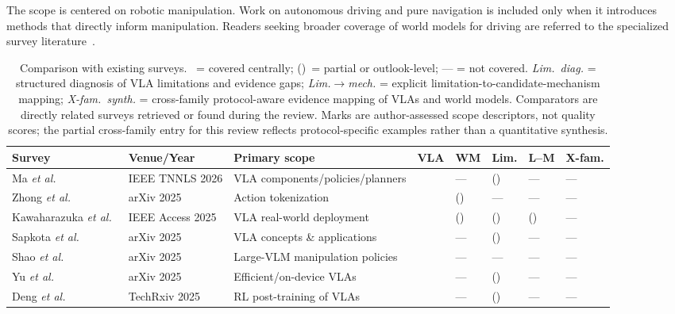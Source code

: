 \documentclass{ieeeaccess}
\newcommand{\cmark}{\ding{51}}
\begin{document}
The scope is centered on robotic manipulation. Work on autonomous driving and pure navigation is included only when it introduces methods that directly inform manipulation. Readers seeking broader coverage of world models for driving are referred to the specialized survey literature~\cite{jiang2025driving}.
\begin{table}[!t]
\caption{Comparison with existing surveys. \cmark~= covered centrally;
(\cmark)~= partial or outlook-level; --- = not covered. \emph{Lim.\ diag.} =
structured diagnosis of VLA limitations and evidence gaps; \emph{Lim.$\to$mech.} =
explicit limitation-to-candidate-mechanism mapping; \emph{X-fam.\ synth.} = cross-family
protocol-aware evidence mapping of VLAs and world models. Comparators are
directly related surveys retrieved or found during the review. \textcolor[RGB]{104,48,148}{Marks are author-assessed scope descriptors, not quality scores; the partial cross-family entry for this review reflects protocol-specific examples rather than a quantitative synthesis.}}
\label{tab:surveys}
\centering
\scriptsize
\setlength{\tabcolsep}{2.5pt}
\begin{tabular}{p{2.7cm}p{2.1cm}p{4.3cm}p{0.8cm}p{0.8cm}p{0.8cm}p{0.8cm}p{0.8cm}}
\toprule
Survey & Venue/Year & Primary scope & VLA & WM & Lim. & L--M & X-fam. \\
\midrule
Ma \emph{et al.}~\cite{ma2024survey} & IEEE TNNLS 2026 & VLA components/policies/planners & \cmark & --- & (\cmark) & --- & --- \\
Zhong \emph{et al.}~\cite{zhong2025token} & arXiv 2025 & Action tokenization & \cmark & (\cmark) & --- & --- & --- \\
Kawaharazuka \emph{et al.}~\cite{kawaharazuka2025} & IEEE Access 2025 & VLA real-world deployment & \cmark & (\cmark) & (\cmark) & (\cmark) & --- \\
Sapkota \emph{et al.}~\cite{sapkota2025} & arXiv 2025 & VLA concepts \& applications & \cmark & --- & (\cmark) & --- & --- \\
Shao \emph{et al.}~\cite{shao2025} & arXiv 2025 & Large-VLM manipulation policies & \cmark & --- & --- & --- & --- \\
Yu \emph{et al.}~\cite{yu2025efficient} & arXiv 2025 & Efficient/on-device VLAs & \cmark & --- & (\cmark) & --- & --- \\
Deng \emph{et al.}~\cite{deng2025rl} & TechRxiv 2025 & RL post-training of VLAs & \cmark & --- & (\cmark) & --- & --- \\

\end{tabular}
\end{table}
\end{document}
